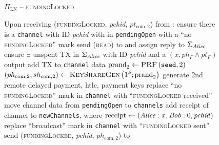   \begin{figure}[H]
    \begin{protocolbox}{$\Pi_{\mathrm{LN}}$ -- \textsc{fundingLocked}}
      \begin{algorithmic}[1]
        \State Upon receiving (\textsc{fundingLocked}, \textit{pchid},
        $pt_{\mathrm{com}, 2}$) from \bob:
        \Indent
          \State ensure there is a \texttt{channel} with ID \textit{pchid} with
          \bob{} in \texttt{pendingOpen} with a ``no \textsc{fundingLocked}''
          mark
           
            \State send (\textsc{read}) to \ledger{} and assign reply to
            $\Sigma_{\mathit{Alice}}$
            \State ensure $\exists$ unspent TX in $\Sigma_{\mathit{Alice}}$ with ID
            \textit{pchid} and a $\left(x, ph_F \wedge pt_F\right)$ output
            \State add TX to \texttt{channel} data
            \State $\mathrm{prand}_2 \gets \textsc{PRF}\left(\mathtt{seed},
            2\right)$
            \label{alg:protocol:fundingLocked:prand}
            \State $\left(ph_{\mathrm{com}, 2}, sh_{\mathrm{com}, 2}\right) \gets
            \textsc{KeyShareGen}\left(1^k; \mathrm{prand}_2\right)$
            \State generate 2nd remote delayed payment, htlc, payment keys
          \EndIf
          \State replace ``no \textsc{fundingLocked}'' mark in \texttt{channel}
          with ``\textsc{fundingLocked} received''
          \State move channel data from \texttt{pendingOpen} to
          \texttt{channels}
          \State add receipt of channel to \texttt{newChannels}, where
          $\mathrm{receipt} \gets (\mathit{Alice}: x, \mathit{Bob}: 0, \mathit{pchid})$
          \label{alg:protocol:fundingLocked:report}
            \State replace ``broadcast'' mark in \texttt{channel} with
            ``\textsc{fundingLocked} sent''
            \State send (\textsc{fundingLocked}, \textit{pchid},
            $ph_{\mathrm{com}, 2}$) to \bob{}
          \EndIf
        \EndIndent
      \end{algorithmic}
    \end{protocolbox}
    \caption{}
    \label{alg:protocol:fundingLocked}
  \end{figure}


